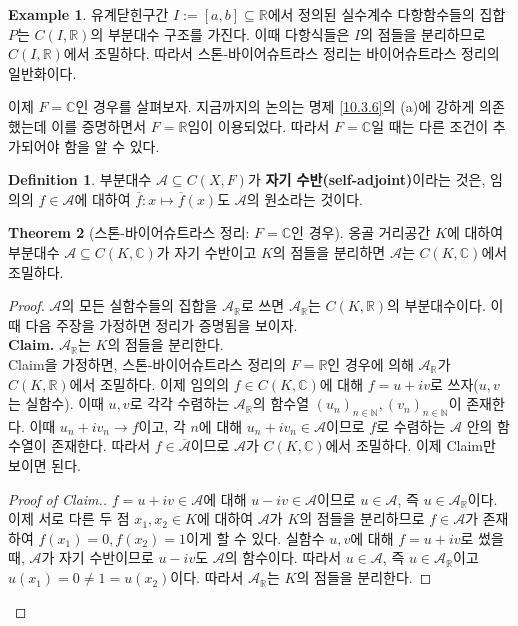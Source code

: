 \documentclass[11pt]{book}
\numberwithin{equation}{chapter}
\def\NN{\mathbb{N}}
\def\RR{\mathbb{R}}
\def\CC{\mathbb{C}}
\def\calA{\mathcal{A}}
\theoremstyle{definition}
\newtheorem{thm}{Theorem}[section]
\newtheorem{defn}[thm]{Definition}
\newtheorem*{ex}{Example}
\begin{document}
\begin{ex}
    유계닫힌구간 \(I := [a, b] \subseteq \RR\)에서 정의된 실수계수 다항함수들의 집합 \(P\)는 \(C(I, \RR)\)의 부분대수 구조를 가진다. 이때 다항식들은 \(I\)의 점들을 분리하므로 \(C(I, \RR)\)에서 조밀하다. 따라서 스톤-바이어슈트라스 정리는 바이어슈트라스 정리의 일반화이다.
\end{ex}

이제 \(F = \CC\)인 경우를 살펴보자. 지금까지의 논의는 명제 \ref{10.3.6}의 (a)에 강하게 의존했는데 이를 증명하면서 \(F = \RR\)임이 이용되었다. 따라서 \(F = \CC\)일 때는 다른 조건이 추가되어야 함을 알 수 있다.

\begin{defn}
    부분대수 \(\calA \subseteq C(X, F)\)가 \textbf{자기 수반(self-adjoint)}이라는 것은, 임의의 \(f \in \calA\)에 대하여 \(\overline{f} : x \mapsto \overline{f}(x)\)도 \(\calA\)의 원소라는 것이다.
\end{defn}

\begin{thm}[스톤-바이어슈트라스 정리: \(F = \CC\)인 경우] \label{10.3.11}
    옹골 거리공간 \(K\)에 대하여 부분대수 \(\calA \subseteq C(K, \CC)\)가 자기 수반이고 \(K\)의 점들을 분리하면 \(\calA\)는 \(C(K, \CC)\)에서 조밀하다.
\end{thm}
\begin{proof}
    \(\calA\)의 모든 실함수들의 집합을 \(\calA_{\RR}\)로 쓰면 \(\calA_{\RR}\)는 \(C(K, \RR)\)의 부분대수이다. 이때 다음 주장을 가정하면 정리가 증명됨을 보이자.\\
    \textbf{Claim.} \(\calA_{\RR}\)는 \(K\)의 점들을 분리한다.\\
    Claim을 가정하면, 스톤-바이어슈트라스 정리의 \(F = \RR\)인 경우에 의해 \(\calA_{\RR}\)가 \(C(K, \RR)\)에서 조밀하다. 이제 임의의 \(f \in C(K, \CC)\)에 대해 \(f = u + iv\)로 쓰자(\(u, v\)는 실함수). 이때 \(u, v\)로 각각 수렴하는 \(\calA_{\RR}\)의 함수열 \((u_n)_{n \in \NN}, (v_n)_{n \in \NN}\)이 존재한다. 이때 \(u_n + iv_n \to f\)이고, 각 \(n\)에 대해 \(u_n + iv_n \in \calA\)이므로 \(f\)로 수렴하는 \(\calA\) 안의 함수열이 존재한다. 따라서 \(f \in \overline{\calA}\)이므로 \(\calA\)가 \(C(K, \CC)\)에서 조밀하다. 이제 Claim만 보이면 된다.
    \begin{proof}[Proof of Claim.]
        \(f = u + iv \in \calA\)에 대해 \(u - iv \in \calA\)이므로 \(u \in \calA\), 즉 \(u \in \calA_{\RR}\)이다. 이제 서로 다른 두 점 \(x_1, x_2 \in K\)에 대하여 \(\calA\)가 \(K\)의 점들을 분리하므로 \(f \in \calA\)가 존재하여 \(f(x_1) = 0, f(x_2) = 1\)이게 할 수 있다. 실함수 \(u, v\)에 대해 \(f = u +iv\)로 썼을 때, \(\calA\)가 자기 수반이므로 \(u - iv\)도 \(\calA\)의 함수이다. 따라서 \(u \in \calA\), 즉 \(u \in \calA_{\RR}\)이고 \(u(x_1) = 0 \ne 1 = u(x_2)\)이다. 따라서 \(\calA_{\RR}\)는 \(K\)의 점들을 분리한다.
    \end{proof}
\end{proof}
\end{document}
